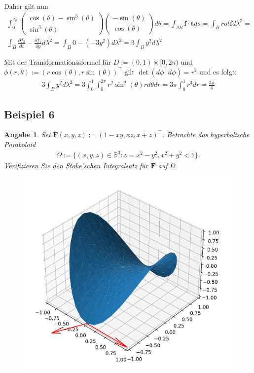\documentclass[]{article}
\newtheorem*{angabe*}{Angabe}
\begin{document}
\begin{enumerate}[label*=(\roman*)]
	Daher gilt nun
	\begin{align*}
		\int_{0}^{2\pi} \begin{pmatrix} \cos(\theta)-\sin^3(\theta)\\ \sin^3(\theta) \end{pmatrix} \begin{pmatrix} -\sin(\theta)\\ \cos(\theta) \end{pmatrix} d\theta = \int_{\partial B} \bm{f} \cdot \bm{t} ds = \int_B rot\bm{f} d\lambda^2 = \\
		\int_B \frac{\partial f_2}{\partial x} - \frac{\partial f_1}{\partial y} d\lambda^2 =		\int_B 0 - (-3y^2) d\lambda^2 = 3 \int_B y^2 d\lambda^2
	\end{align*}

	Mit der Transformationssformel für $D:=(0,1)\times[0,2\pi)$ und $\phi(r,\theta):=(r\cos(\theta), r\sin(\theta))^\top$ gilt $\det(d\phi^\top d\phi) = r^2$ und es folgt:
	\begin{align*}
		3 \int_B y^2 d\lambda^2 = 3 \int_{0}^{1} \int_{0}^{2\pi} r^2 \sin^2(\theta) r d\theta dr = 3\pi \int_{0}^{1} r^3 dr = \frac{3\pi}{4}
	\end{align*}
\end{enumerate}
\newpage

\subsection*{Beispiel 6}
\begin{angabe*}
	Sei $\bm{F}(x,y,z):=(1-xy, xz, x+z)^\top$. Betrachte das hyperbolische Paraboloid
	\begin{align*}
		\Omega := \{(x,y,z) \in \mathbb{R}^3: z = x^2-y^2, x^2+y^2 < 1\}.
	\end{align*}
	Verifizieren Sie den Stoke'schen Integralsatz für $\bm{F}$ auf $\Omega$.
\end{angabe*}

\begin{figure}[h!]
	\includegraphics[width=0.5\columnwidth]{bsp_6.png}
\end{figure}
\end{document}
